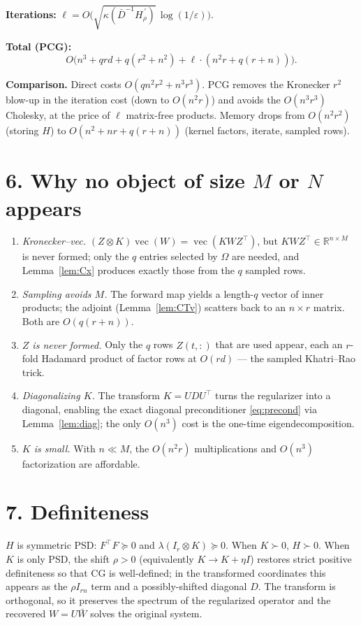 \documentclass[11pt]{article}
\newcommand{\R}{\mathbb{R}}
\newcommand{\vecop}{\operatorname{vec}}
\newcommand{\bW}{\bar W}
\newcommand{\bD}{\bar D}
\begin{document}
\textbf{Iterations:}
$\ell=O\bigl(\sqrt{\kappa(\bD^{-1}H_\rho^{\,\prime})}\,\log(1/\varepsilon)\bigr)$.

\textbf{Total (PCG):}
\[
  O\bigl(n^3 + qrd + q(r^2+n^2) + \ell\cdot(n^2r+q(r+n))\bigr).
\]

\textbf{Comparison.} Direct costs $O(qn^2r^2+n^3r^3)$. PCG removes the
Kronecker $r^2$ blow-up in the iteration cost (down to $O(n^2r)$) and avoids
the $O(n^3r^3)$ Cholesky, at the price of $\ell$ matrix-free products. Memory
drops from $O(n^2r^2)$ (storing $H$) to $O(n^2+nr+q(r+n))$ (kernel factors,
iterate, sampled rows).

\section*{6. Why no object of size \texorpdfstring{$M$}{M} or \texorpdfstring{$N$}{N} appears}

\begin{enumerate}\setlength\itemsep{4pt}
\item \emph{Kronecker--vec.} $(Z\otimes K)\vecop(W)=\vecop(KWZ^{\!\top})$, but
$KWZ^{\!\top}\in\R^{n\times M}$ is never formed; only the $q$ entries selected
by $\Omega$ are needed, and Lemma~\ref{lem:Cx} produces exactly those from the
$q$ sampled rows.
\item \emph{Sampling avoids $M$.} The forward map yields a length-$q$ vector of
inner products; the adjoint (Lemma~\ref{lem:CTv}) scatters back to an
$n\times r$ matrix. Both are $O(q(r+n))$.
\item \emph{$Z$ is never formed.} Only the $q$ rows $\widehat Z(t,:)$ that are
used appear, each an $r$-fold Hadamard product of factor rows at $O(rd)$ — the
sampled Khatri--Rao trick.
\item \emph{Diagonalizing $K$.} The transform $K=UDU^{\!\top}$ turns the
regularizer into a diagonal, enabling the exact diagonal preconditioner
\eqref{eq:precond} via Lemma~\ref{lem:diag}; the only $O(n^3)$ cost is the
one-time eigendecomposition.
\item \emph{$K$ is small.} With $n\ll M$, the $O(n^2r)$ multiplications and
$O(n^3)$ factorization are affordable.
\end{enumerate}

\section*{7. Definiteness}

$H$ is symmetric PSD: $F^{\!\top}F\succeq0$ and $\lambda(I_r\otimes K)\succeq0$.
When $K\succ0$, $H\succ0$. When $K$ is only PSD, the shift $\rho>0$ (equivalently
$K\to K+\eta I$) restores strict positive definiteness so that CG is
well-defined; in the transformed coordinates this appears as the
$\rho I_{rn}$ term and a possibly-shifted diagonal $D$. The transform is
orthogonal, so it preserves the spectrum of the regularized operator and the
recovered $W=U\bW$ solves the original system.
\end{document}
